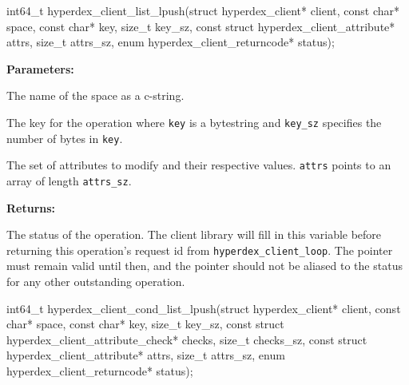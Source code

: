 \funcsep
{}
\begin{ccode}
int64_t hyperdex_client_list_lpush(struct hyperdex_client* client,
                const char* space,
                const char* key, size_t key_sz,
                const struct hyperdex_client_attribute* attrs, size_t attrs_sz,
                enum hyperdex_client_returncode* status);
\end{ccode}
\funcdesc 

\noindent\textbf{Parameters:}
\begin{description}[labelindent=\widthof{{\texttt{attrs}, \texttt{attrs\_sz}}},leftmargin=*,noitemsep,nolistsep,align=right]
\item[\texttt{space}] The name of the space as a c-string.
\item[\texttt{key}, \texttt{key\_sz}] The key for the operation where \texttt{key} is a bytestring and \texttt{key\_sz} specifies the number of bytes in \texttt{key}.
\item[\texttt{attrs}, \texttt{attrs\_sz}] The set of attributes to modify and their respective values.  \texttt{attrs} points to an array of length \texttt{attrs\_sz}.
\end{description}

\noindent\textbf{Returns:}
\begin{description}[labelindent=\widthof{{\texttt{status}}},leftmargin=*,noitemsep,nolistsep,align=right]
\item[\texttt{status}] The status of the operation.  The client library will fill in this variable before returning this operation's request id from \texttt{hyperdex\_client\_loop}.  The pointer must remain valid until then, and the pointer should not be aliased to the status for any other outstanding operation.
\end{description}

\funcsep
{}
\begin{ccode}
int64_t hyperdex_client_cond_list_lpush(struct hyperdex_client* client,
                const char* space,
                const char* key, size_t key_sz,
                const struct hyperdex_client_attribute_check* checks, size_t checks_sz,
                const struct hyperdex_client_attribute* attrs, size_t attrs_sz,
                enum hyperdex_client_returncode* status);
\end{ccode}
\funcdesc 

